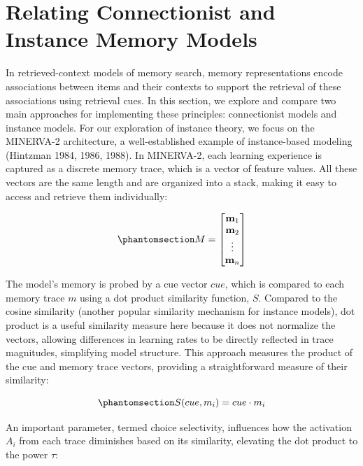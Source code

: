 \documentclass[
  letterpaper,
  11pt,
  english,
  singlespacing,
  headsepline]{MastersDoctoralThesis}
\begin{document}
\section{Relating Connectionist and Instance Memory
Models}\label{relating-connectionist-and-instance-memory-models}

In retrieved-context models of memory search, memory representations
encode associations between items and their contexts to support the
retrieval of these associations using retrieval cues. In this section,
we explore and compare two main approaches for implementing these
principles: connectionist models and instance models. For our
exploration of instance theory, we focus on the MINERVA-2 architecture,
a well-established example of instance-based modeling (Hintzman 1984,
1986, 1988). In MINERVA-2, each learning experience is captured as a
discrete memory trace, which is a vector of feature values. All these
vectors are the same length and are organized into a stack, making it
easy to access and retrieve them individually:

\begin{equation}\phantomsection\label{eq-intro0}{
M = \begin{bmatrix}
\mathbf{m}_1 \\
\mathbf{m}_2 \\
\vdots \\
\mathbf{m}_n
\end{bmatrix}
}\end{equation}

The model's memory is probed by a cue vector \(cue\), which is compared
to each memory trace \(m\) using a dot product similarity function,
\(S\). Compared to the cosine similarity (another popular similarity
mechanism for instance models), dot product is a useful similarity
measure here because it does not normalize the vectors, allowing
differences in learning rates to be directly reflected in trace
magnitudes, simplifying model structure. This approach measures the
product of the cue and memory trace vectors, providing a straightforward
measure of their similarity:

\begin{equation}\phantomsection\label{eq-intro1}{
S(cue, m_i) = cue \cdot m_i
}\end{equation}

An important parameter, termed choice selectivity, influences how the
activation \(A_i\) from each trace diminishes based on its similarity,
elevating the dot product to the power \(\tau\):
\end{document}

